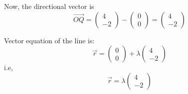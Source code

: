 \documentclass{article}
\begin{document}
Now, the directional vector is
\begin{equation}
    \vec{OQ}
    =\left(\begin{array}{c}
    4\\
    -2
    \end{array}\right)
    -\left(\begin{array}{c}
    0\\
    0
    \end{array}\right)
    = \left(\begin{array}{c}
    4\\
    -2
    \end{array}\right)
\end{equation}

Vector equation of the line is:
\begin{equation}
    \vec{r}=
    \left(\begin{array}{c}
    0\\
    0
    \end{array}\right)
    +\lambda
    \left(\begin{array}{c}
    4\\
    -2
    \end{array}\right)
\end{equation}
i.e,
\begin{equation}
    \vec{r}=
    \lambda
    \left(\begin{array}{c}
    4\\
    -2
    \end{array}\right)
\end{equation}
\end{document}
